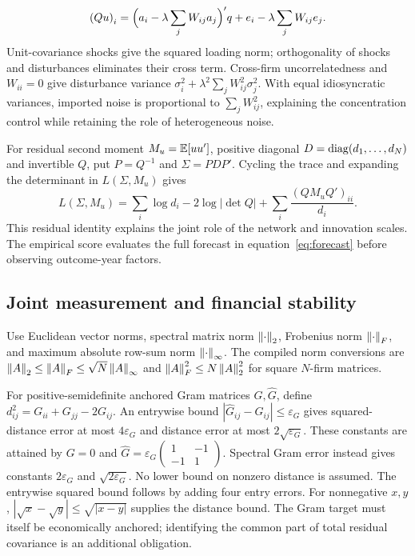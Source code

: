 \documentclass[11pt]{article}
\renewcommand{\lean}[1]{\ignorespaces}
\renewcommand{\leanok}{\ignorespaces}
\begin{document}
\[
  {(Qu)}_i=\Bigl(a_i-\lambda\sum_j W_{ij}a_j\Bigr)'q
  +e_i-\lambda\sum_j W_{ij}e_j.
\]
Unit-covariance shocks give the squared loading norm; orthogonality of shocks
and disturbances eliminates their cross term. Cross-firm uncorrelatedness and
$W_{ii}=0$ give disturbance variance
$\sigma_i^2+\lambda^2\sum_j W_{ij}^2\sigma_j^2$.
\lean{FreeFoundations.Likelihood.filtered_second_moment}\leanok{}
With equal idiosyncratic variances, imported noise is proportional to
$\sum_j W_{ij}^2$, explaining the concentration control while retaining the role
of heterogeneous noise.

For residual second moment $M_u=\mathbb{E}[uu']$, positive diagonal
$D=\operatorname{diag}(d_1,\ldots,d_N)$ and invertible $Q$, put $P=Q^{-1}$ and $\Sigma=PDP'$.
Cycling the trace and expanding the determinant in
$L(\Sigma,M_u)$ gives
\begin{equation}\label{eq:spatial-loss}
  L(\Sigma,M_u)=\sum_i\log d_i-2\log|\det Q|
  +\sum_i\frac{{(Q M_u Q')}_{ii}}{d_i}.
\end{equation}
\lean{FreeFoundations.Likelihood.spatial_loss}\leanok{}
This residual identity explains the joint role of the network and innovation
scales. The empirical score evaluates the full forecast in
equation~\eqref{eq:forecast} before observing outcome-year factors.

\subsection{Joint measurement and financial stability}\label{app:network}
Use Euclidean vector norms, spectral matrix norm $\left\lVert\cdot\right\rVert_2$, Frobenius
norm $\left\lVert\cdot\right\rVert_F$, and maximum absolute row-sum norm
$\left\lVert\cdot\right\rVert_\infty$. The compiled norm conversions are
$\left\lVert A\right\rVert_2\le\left\lVert A\right\rVert_F\le\sqrt N\left\lVert A\right\rVert_\infty$ and
$\left\lVert A\right\rVert_F^2\le N\left\lVert A\right\rVert_2^2$ for square $N$-firm matrices.
\lean{FreeFoundations.MatrixBounds.spectralNorm_le_frobeniusNorm,
  FreeFoundations.MatrixBounds.frobeniusNorm_le_sqrt_card_mul_rowSumNorm,
FreeFoundations.MatrixBounds.frobeniusNorm_sq_le_card_mul_spectralNorm_sq}\leanok{}

For positive-semidefinite anchored Gram matrices $G,\widehat G$, define
$d_{ij}^2=G_{ii}+G_{jj}-2G_{ij}$. An entrywise bound
$|\widehat G_{ij}-G_{ij}|\le\varepsilon_G$ gives squared-distance error at most
$4\varepsilon_G$ and distance error at most $2\sqrt{\varepsilon_G}$.
These constants are attained by $G=0$ and
$\widehat G=\varepsilon_G\left(
  \begin{smallmatrix}1&-1\\-1&1
\end{smallmatrix}\right)$.
Spectral Gram error instead gives constants $2\varepsilon_G$ and
$\sqrt{2\varepsilon_G}$. No lower bound on nonzero distance is assumed.
\lean{FreeFoundations.GramDistance.distance_error,
  FreeFoundations.GramDistance.distance_error_spectral,
FreeFoundations.GramDistance.sharpGram_distance}\leanok{}
The entrywise squared bound follows by adding four entry errors. For
nonnegative $x,y$, $|\sqrt x-\sqrt y|\le\sqrt{|x-y|}$ supplies the
distance bound.
The Gram target must itself be economically anchored; identifying the common
part of total residual covariance is an additional obligation.
\end{document}
